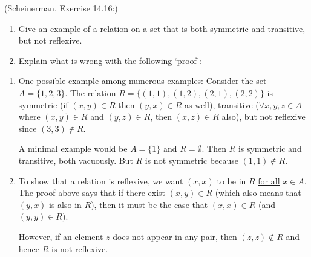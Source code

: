 \documentclass{article}
\theoremstyle{definition}
\begin{document}
\begin{question}
    (Scheinerman, Exercise 14.16:)
    \begin{enumerate}
        \item Give an example of a relation on a set that is both symmetric and transitive, but not reflexive.
        \item Explain what is wrong with the following `proof':
        
    \end{enumerate}
\end{question}
\begin{solution}
    \begin{enumerate}
    \item One possible example among numerous examples: Consider the set $A = \{1, 2, 3\}$.  The relation $R = \{ (1, 1), (1, 2), (2, 1), (2, 2) \}$ is symmetric (if $(x, y) \in R$ then $(y, x) \in R$ as well), transitive ($\forall x, y,z \in A$ where $(x, y)\in R$ and $(y, z) \in R$, then $(x, z) \in R$ also), but not reflexive since $(3, 3) \notin R$.
    
    A minimal example would be $A = \{1\}$ and $R = \emptyset$. Then $R$ is symmetric and transitive, both vacuously. But $R$ is not symmetric because $(1,1) \notin R$.
    \item To show that a relation is reflexive, we want $(x, x)$ to be in $R$ \underline{for all} $x \in A$.  The proof above says that if there exist $(x, y) \in R$ (which also means that $(y, x)$ is also in $R$), then it must be the case that $(x,x) \in R$ (and $(y,y) \in R)$.  

    However, if an element $z$ does not appear in any pair, then $(z, z) \notin R$ and hence $R$ is not reflexive.
    \end{enumerate}
\end{solution}
\end{document}
